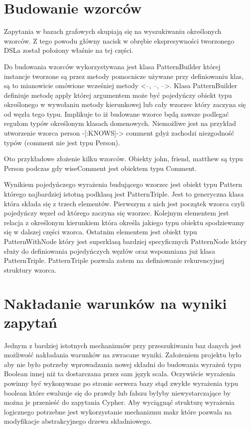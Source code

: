 \documentclass[brudnopis]{xmgr}
\begin{document}


\section{Budowanie wzorców}

Zapytania w bazach grafowych skupiają się na wyszukiwaniu określonych wzorców. Z tego powodu główny nacisk w obrębie ekspresywności tworzonego DSLa został położony właśnie na tej części.

Do budowania wzorców wykorzystywana jest klasa PatternBuilder której instancje tworzone są przez metody pomocnicze używane przy definiowaniu klas, są to mianowicie omówione wcześniej metody <--, --, -->. Klasa PatternBuilder definiuje metodę apply której argumentem może być pojedyńczy obiekt typu określonego w wywołaniu metody kierunkowej lub cały wzorzec który zaczyna się od węzła tego typu. Implikuje to iż budowane wzorce będą zawsze podlegać regułom typów określonym klasach domenowych. Niemożliwe jest na przykład utworzenie wzorca person -[:KNOWS]-> comment gdyż zachodzi niezgodność typów (comment nie jest typu Person).

Oto przykładowe złożenie kilku wzorców. Obiekty john, friend, matthew są typu Person podczas gdy wiseComment jest obiektem typu Comment.



Wynikiem pojedyńczego wyrażenia budującego wzorzec jest obiekt typu Pattern którego najbardziej istotną podklasą jest PatternTriple. Jest to generyczna klasa która składa się z trzech elementów. Pierwszym z nich jest początek wzorca czyli pojedyńczy węzeł od którego zaczyna się wzorzec. Kolejnym elementem jest relacja z określonym kierunkiem która określa jakiego typu obiektu spodziewamy się w dalszej części wzorca. Ostatnim elementem jest obiekt typu PatternWithNode który jest superklasą bardziej specyficznych PatternNode który służy do definiowania pojedyńczych węzłów oraz wspomniana już klasa PatternTriple. PatternTriple pozwala zatem na definiowanie rekurencyjnej struktury wzorca.

\section{Nakładanie warunków na wyniki zapytań}

Jednym z bardziej istotnych mechanizmów przy przeszukiwaniu baz danych jest możliwość nakładania warunków na zwracane wyniki. Założeniem projektu było aby nie było potrzeby wprowadzania nowej składni do budowania wyrażeń typu Boolean innej niż ta dostarczana przez sam język scala. Oczywiście wyrażenia powinny być wykonywane po stronie serwera bazy stąd zwykłe wyrażenia typu boolean które ewaluuje się do prawdy lub fałszu byłyby niewystarczające by można je przenieść do zapytania Cypher. Aby wyciągnąć strukturę wyrażenia logicznego potrzebne jest wykorzystanie mechanizmu makr które pozwala na modyfikacje abstrakcyjnego drzewa składniowego.
\end{document}
